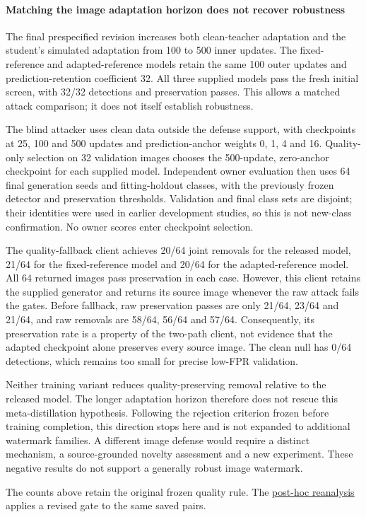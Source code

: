 \paragraph{Matching the image adaptation horizon does not recover robustness}
\label{sec:horizon500_outcome}
The final prespecified revision increases both clean-teacher adaptation and the student's simulated adaptation from 100 to 500 inner updates. The fixed-reference and adapted-reference models retain the same 100 outer updates and prediction-retention coefficient 32. All three supplied models pass the fresh initial screen, with 32/32 detections and preservation passes. This allows a matched attack comparison; it does not itself establish robustness.

The blind attacker uses clean data outside the defense support, with checkpoints at 25, 100 and 500 updates and prediction-anchor weights 0, 1, 4 and 16. Quality-only selection on 32 validation images chooses the 500-update, zero-anchor checkpoint for each supplied model. Independent owner evaluation then uses 64 final generation seeds and fitting-holdout classes, with the previously frozen detector and preservation thresholds. Validation and final class sets are disjoint; their identities were used in earlier development studies, so this is not new-class confirmation. No owner scores enter checkpoint selection.



The quality-fallback client achieves 20/64 joint removals for the released model, 21/64 for the fixed-reference model and 20/64 for the adapted-reference model. All 64 returned images pass preservation in each case. However, this client retains the supplied generator and returns its source image whenever the raw attack fails the gates. Before fallback, raw preservation passes are only 21/64, 23/64 and 21/64, and raw removals are 58/64, 56/64 and 57/64. Consequently, its preservation rate is a property of the two-path client, not evidence that the adapted checkpoint alone preserves every source image. The clean null has 0/64 detections, which remains too small for precise low-FPR validation.

Neither training variant reduces quality-preserving removal relative to the released model. The longer adaptation horizon therefore does not rescue this meta-distillation hypothesis. Following the rejection criterion frozen before training completion, this direction stops here and is not expanded to additional watermark families. A different image defense would require a distinct mechanism, a source-grounded novelty assessment and a new experiment. These negative results do not support a generally robust image watermark.

The counts above retain the original frozen quality rule. The \hyperref[sec:quality_recalibration]{post-hoc reanalysis} applies a revised gate to the same saved pairs.
